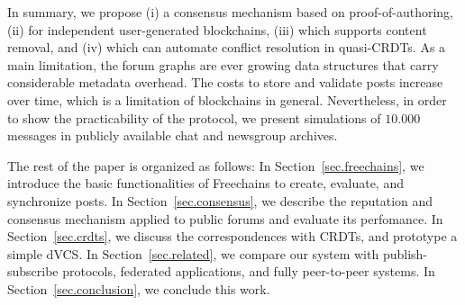 \documentclass[10pt,journal,compsoc]{IEEEtran}
\newcommand{\FC}       {Freechains\xspace}
\begin{document}
In summary, we propose
    (i)   a consensus mechanism based on proof-of-authoring,
    (ii)  for independent user-generated blockchains,
    (iii) which supports content removal, and
    (iv)  which can automate conflict resolution in quasi-CRDTs.
%
As a main limitation, the forum graphs are ever growing data structures that
carry considerable metadata overhead.
The costs to store and validate posts increase over time, which is a limitation
of blockchains in general.
%
Nevertheless, in order to show the practicability of the protocol, we present
simulations of $10.000$ messages in publicly available chat and newsgroup
archives.

The rest of the paper is organized as follows:
In Section~\ref{sec.freechains}, we introduce the basic functionalities of \FC
to create, evaluate, and synchronize posts.
In Section~\ref{sec.consensus}, we describe the reputation and consensus
mechanism applied to public forums and evaluate its perfomance.
In Section~\ref{sec.crdts}, we discuss the correspondences with CRDTs, and
prototype a simple dVCS.
In Section~\ref{sec.related}, we compare our system with publish-subscribe
protocols, federated applications, and fully peer-to-peer systems.
In Section~\ref{sec.conclusion}, we conclude this work.
\end{document}
